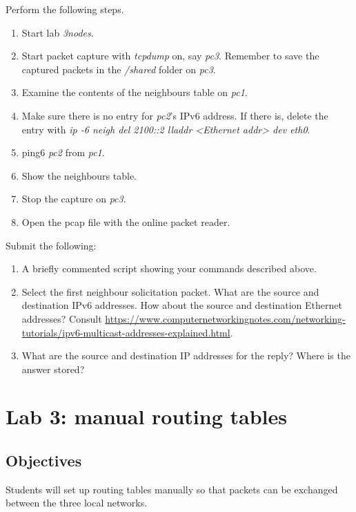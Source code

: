 \documentclass[12pt]{book}
\begin{document}
\begin{enumerate}[label=\arabic*.]
\begin{enumerate}
  Perform the following steps.
  \begin{enumerate}[label=(\roman*)]
  \item Start lab \emph{3nodes}.
  \item Start packet capture with \emph{tcpdump} on, say \emph{pc3}. Remember to save the captured packets in the \emph{/shared} folder on \emph{pc3}.
  \item Examine the contents of the neighbours table on \emph{pc1}.
  \item Make sure there is no entry for \emph{pc2}'s IPv6 address. If there is, delete the entry with \emph{ip -6 neigh del 2100::2 lladdr <Ethernet addr> dev eth0}.
  \item ping6 \emph{pc2} from \emph{pc1}.
  \item Show the neighbours table.
  \item Stop the capture on \emph{pc3}.
    \item Open the pcap file with the online packet reader. 
  \end{enumerate}

      \smallskip
      Submit the following:
  \begin{enumerate}[label=(\alph*)]
  \item A briefly commented script showing your commands described above.
  \item Select the first neighbour solicitation packet. What are the source and destination IPv6 addresses. How about the source and destination Ethernet addresses?
    Consult \url{https://www.computernetworkingnotes.com/networking-tutorials/ipv6-multicast-addresses-explained.html}.
    \item What are the source and destination IP addresses for the reply? Where is the answer stored?
  \end{enumerate}
\end{enumerate}



\chapter{Lab 3: manual routing tables}

\section{Objectives}

Students will set up routing tables manually so that packets can be exchanged between the three local networks.


\end{enumerate}
\end{document}
